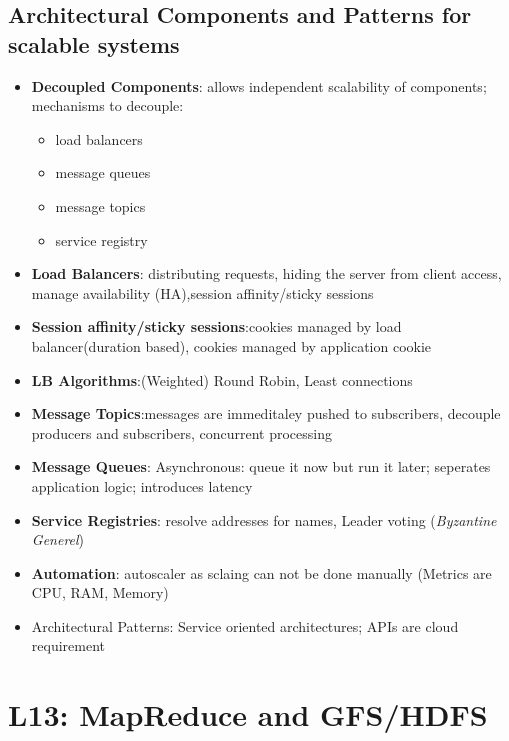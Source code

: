 \documentclass[a4paper]{article}
\begin{document}
\begin{multicols}{3}
\subsection*{Architectural Components and Patterns for scalable systems}
\begin{itemize}
    \item \textbf{Decoupled Components}: allows independent scalability of components; mechanisms to decouple:
    \begin{itemize}
        \item load balancers
        \item message queues
        \item message topics
        \item service registry
    \end{itemize}
    \item \textbf{Load Balancers}: distributing requests, hiding the server from client access, manage availability (HA),session affinity/sticky sessions
    \item \textbf{Session affinity/sticky sessions}:cookies managed by load balancer(duration based), cookies managed by application cookie
    \item \textbf{LB Algorithms}:(Weighted) Round Robin, Least connections
    \item \textbf{Message Topics}:messages are immeditaley pushed to subscribers, decouple producers and subscribers, concurrent processing
    \item \textbf{Message Queues}: Asynchronous: queue it now but run it later; seperates application logic; introduces latency
    \item \textbf{Service Registries}: resolve addresses for names, Leader voting (\textit{Byzantine Generel})
    \item \textbf{Automation}: autoscaler as sclaing can not be done manually (Metrics are CPU, RAM, Memory)
    \item Architectural Patterns: Service oriented architectures;  APIs are cloud requirement
\end{itemize}

\section*{L13: MapReduce and GFS/HDFS}


\end{multicols}
\end{document}

